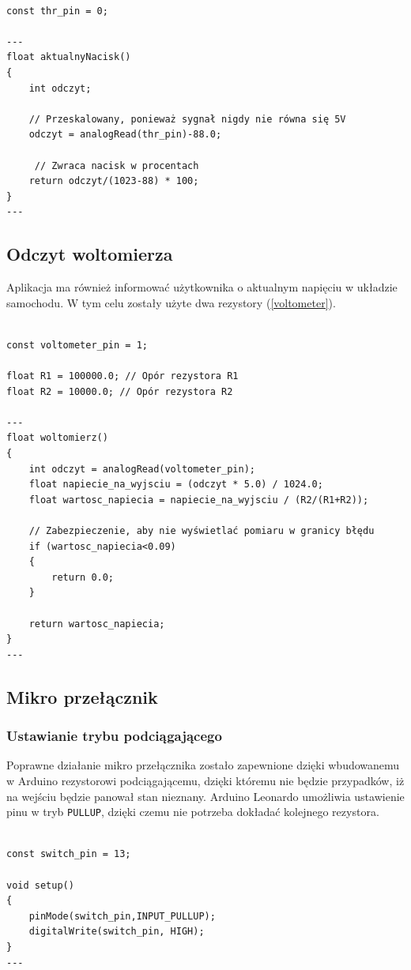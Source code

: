 \begin{lstlisting}[label=list:code_thr,caption=Obliczanie procentowego nacisku na pedał gazu,
basicstyle=\footnotesize\ttfamily]

const thr_pin = 0;

---
float aktualnyNacisk()
{
    int odczyt;
    
    // Przeskalowany, ponieważ sygnał nigdy nie równa się 5V
    odczyt = analogRead(thr_pin)-88.0; 
    
     // Zwraca nacisk w procentach
    return odczyt/(1023-88) * 100;
}
---
\end{lstlisting}


\subsection{Odczyt woltomierza} \label{voltometer_code}

Aplikacja ma również informować użytkownika o aktualnym napięciu w układzie samochodu. W tym celu zostały użyte dwa rezystory (\ref{voltometer}).

\begin{lstlisting}[label=list:code_thr,caption=Obliczanie aktualnego napięcia,
basicstyle=\footnotesize\ttfamily]

const voltometer_pin = 1;

float R1 = 100000.0; // Opór rezystora R1
float R2 = 10000.0; // Opór rezystora R2

---
float woltomierz()
{
    int odczyt = analogRead(voltometer_pin);
    float napiecie_na_wyjsciu = (odczyt * 5.0) / 1024.0;
    float wartosc_napiecia = napiecie_na_wyjsciu / (R2/(R1+R2));
    
    // Zabezpieczenie, aby nie wyświetlać pomiaru w granicy błędu
    if (wartosc_napiecia<0.09)
    {
    	return 0.0;
    }
    
    return wartosc_napiecia;
}
---
\end{lstlisting}


\subsection{Mikro przełącznik}

\subsubsection{Ustawianie trybu podciągającego}

Poprawne działanie mikro przełącznika zostało zapewnione dzięki wbudowanemu w Arduino rezystorowi podciągającemu, dzięki któremu nie będzie przypadków, iż na wejściu będzie panował stan nieznany. Arduino Leonardo umożliwia ustawienie pinu w tryb \texttt{PULLUP}, dzięki czemu nie potrzeba dokładać kolejnego rezystora. 
\begin{lstlisting}[label=list:code_pullup,caption=Ustawianie pinu switcha w tryb PULLUP,
basicstyle=\footnotesize\ttfamily]

const switch_pin = 13;

void setup()
{
    pinMode(switch_pin,INPUT_PULLUP);
    digitalWrite(switch_pin, HIGH);
}
---
\end{lstlisting}

